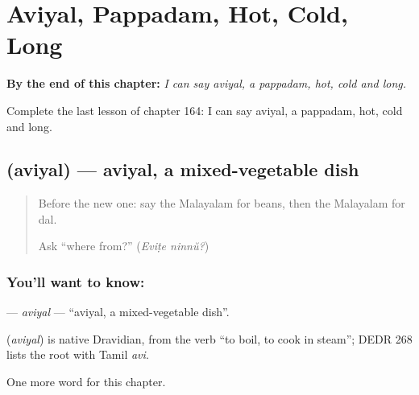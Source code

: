 
\chapter{Aviyal, Pappadam, Hot, Cold, Long}
\label{ch:ml-aviyal-pappadam-hot-cold-long}

\begin{chapteropening}
\textbf{By the end of this chapter:} \emph{I can say aviyal, a pappadam, hot, cold and long.}

Complete the last lesson of chapter 164: I can say aviyal, a pappadam, hot, cold and long.
\end{chapteropening}

\section[\texorpdfstring{\ml{അവിയൽ} (aviyal)}{അവിയൽ (aviyal)}]{ (aviyal) — aviyal, a mixed-vegetable dish}

\label{lesson:ML-C164-aviyal}



\begin{quote}
Before the new one: say the Malayalam for beans, then the Malayalam for dal.

Ask \textquotedblleft{}where from?\textquotedblright{} (\emph{Eviṭe ninnŭ?})
\end{quote}

\subsection*{You'll want to know: }
\textbf{} — \emph{aviyal} — \textquotedblleft{}aviyal, a mixed-vegetable dish\textquotedblright{}.

\begin{cousinweb}
\textbf{} (\emph{aviyal}) is native Dravidian, from the verb \textquotedblleft{}to boil, to cook in steam\textquotedblright{}; DEDR 268 lists the root with Tamil \emph{avi}.
\end{cousinweb}

\begin{grammarlens}[title={What you've built}]
One more word for this chapter.
\end{grammarlens}

